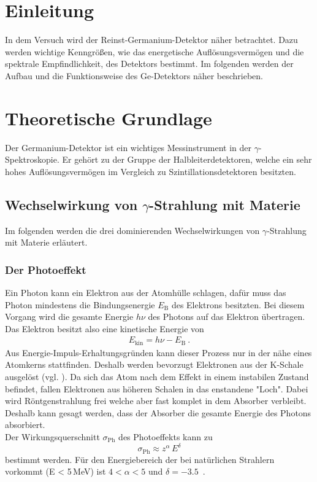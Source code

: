\section{Einleitung}
In dem Versuch wird der Reinst-Germanium-Detektor näher betrachtet. Dazu werden wichtige Kenngrößen, wie das energetische Auflösungsvermögen und die spektrale Empfindlichkeit, des Detektors bestimmt. Im folgenden werden der Aufbau und die Funktionsweise des Ge-Detektors näher beschrieben.



\section{Theoretische Grundlage}
\label{sec:Theorie}
Der Germanium-Detektor ist ein wichtiges Messinstrument in der $\gamma$-Spektroskopie. Er gehört zu der Gruppe der Halbleiterdetektoren, welche ein sehr hohes Auflösungsvermögen im Vergleich zu Szintillationsdetektoren besitzten.



\subsection{Wechselwirkung von \texorpdfstring{$\gamma$}{}-Strahlung mit Materie}
Im folgenden werden die drei dominierenden Wechselwirkungen von $\gamma$-Strahlung mit Materie erläutert.



\subsubsection{Der Photoeffekt}
Ein Photon kann ein Elektron aus der Atomhülle schlagen, dafür muss das Photon mindestens die Bindungsenergie $E_\text{B}$ des Elektrons besitzten. Bei diesem Vorgang wird die gesamte Energie $h\nu$ des Photons auf das Elektron übertragen. Das Elektron besitzt also eine kinetische Energie von
\begin{align}
	E_\text{kin} = h\nu - E_\text{B} \ .
\end{align}
Aus Energie-Impuls-Erhaltungsgründen kann dieser Prozess nur in der nähe eines Atomkerns stattfinden. Deshalb werden bevorzugt Elektronen aus der K-Schale ausgelöst (vgl. \cite[3]{V18}). Da sich das Atom nach dem Effekt in einem instabilen Zustand befindet, fallen Elektronen aus höheren Schalen in das enstandene "Loch". Dabei wird Röntgenstrahlung frei welche aber fast komplet in dem Absorber verbleibt. Deshalb kann gesagt werden, dass der Absorber die gesamte Energie des Photons absorbiert. \\
Der Wirkungsquerschnitt $\sigma_\text{Ph}$ des Photoeffekts kann zu
\begin{equation}
	\sigma_\text{Ph} \approx z^{\alpha}\,E^{\delta}
\end{equation}
bestimmt werden. Für den Energiebereich der bei natürlichen Strahlern vorkommt (E < 5\,MeV) ist $4 < \alpha < 5$ und $\delta = -3.5$\ .



